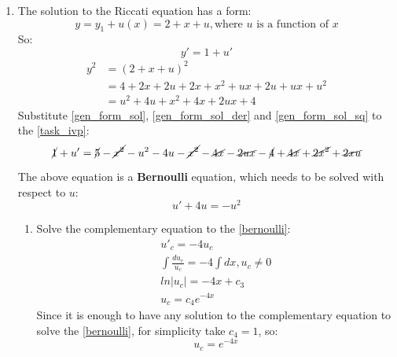 \documentclass[12pt,a4paper,titlepage,twoside]{article}
\begin{document}
\begin{enumerate}
    \item The solution to the Riccati equation has a form:
    \begin{equation} \label{gen_form_sol}
      y = y_1 + u(x) = 2 + x + u, \text{where $u$ is a function of $x$}
    \end{equation}
    So:
    \begin{equation} \label{gen_form_sol_der}
      y' = 1 + u'
    \end{equation}
    \begin{align}
      y^2 &= (2 + x + u)^2 \nonumber \\
      &= 4 + 2x + 2u + 2x + x^2 + ux + 2u + ux + u^2 \nonumber \\
      &= u^2 + 4u + x^2 + 4x + 2ux + 4 \label{gen_form_sol_sq}
    \end{align}
    Substitute \eqref{gen_form_sol}, \eqref{gen_form_sol_der} and \eqref{gen_form_sol_sq} to the \eqref{task_ivp}:
    \begin{equation*}
      \cancel{1} + u' = \cancel{5} - \cancel{x^2} - u^2 - 4u - \cancel{x^2} - \cancel{4x} - \cancel{2ux} - \cancel{4} + \cancel{4x} + \cancel{2x^2} + \cancel{2xu}
    \end{equation*}

    The above equation is a \textbf{Bernoulli} equation, which needs to be solved with respect to $u$:
    \begin{equation} \label{bernoulli}
      u' + 4u = -u^2
    \end{equation}
    \begin{enumerate}
      \item Solve the complementary equation to the \eqref{bernoulli}:
      \begin{gather*}
        u'_c = -4u_c\\
        \int \frac{du_c}{u_c} = -4 \int dx, u_c \neq 0\\
        ln|u_c| = -4x + c_3\\
        u_c = c_4e^{-4x}
      \end{gather*}
      Since it is enough to have any solution to the complementary equation to solve the \eqref{bernoulli}, for simplicity take $c_4 = 1$, so:
      \begin{equation} \label{bernoulli_comp_sol}
        u_c = e^{-4x}
      \end{equation}


\end{enumerate}
\end{enumerate}
\end{document}
